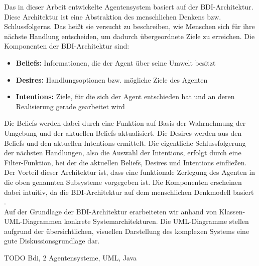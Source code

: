 \documentclass[runningheads]{llncs}
\begin{document}
Das in dieser Arbeit entwickelte Agentensystem basiert auf der BDI-Architektur. Diese Architektur ist eine Abstraktion des menschlichen Denkens bzw. Schlussfolgerns. Das heißt sie versucht zu beschreiben, wie Menschen sich für ihre nächste Handlung entscheiden, um dadurch übergeordnete Ziele zu erreichen. Die Komponenten der BDI-Architektur sind:
\begin{itemize}
\item{{\bf Beliefs:} Informationen, die der Agent über seine Umwelt besitzt}
\item{{\bf Desires:} Handlungsoptionen bzw. mögliche Ziele des Agenten}
\item{{\bf Intentions:} Ziele, für die sich der Agent entschieden hat und an deren Realisierung gerade gearbeitet wird}
\end{itemize}

Die Beliefs werden dabei durch eine Funktion auf Basis der Wahrnehmung der Umgebung und der aktuellen Beliefs aktualisiert. Die Desires werden aus den Beliefs und den aktuellen Intentions ermittelt. Die eigentliche Schlussfolgerung der nächsten Handlungen, also die Auswahl der Intentions, erfolgt durch eine Filter-Funktion, bei der die aktuellen Beliefs, Desires und Intentions einfließen. Der Vorteil dieser Architektur ist, dass eine funktionale Zerlegung des Agenten in die oben genannten Subsysteme vorgegeben ist. Die Komponenten erscheinen dabei intuitiv, da die BDI-Architektur auf dem menschlichen Denkmodell basiert \cite{Weiss2000}.\\

Auf der Grundlage der BDI-Architektur erarbeiteten wir anhand von Klassen-UML-Diagrammen konkrete Systemarchitekturen. Die UML-Diagramme stellen aufgrund der übersichtlichen, visuellen Darstellung des komplexen Systems eine gute Diskussionsgrundlage dar.

TODO Bdi, 2 Agentensysteme, UML, Java
\end{document}
